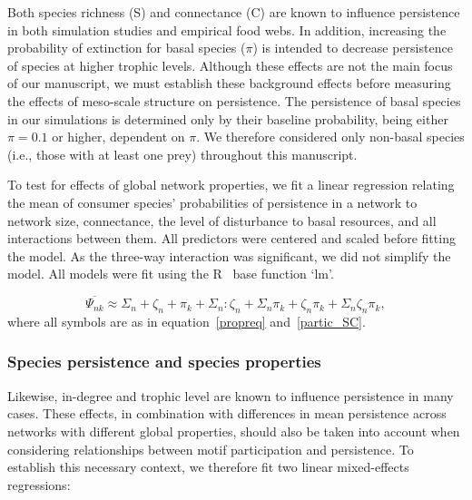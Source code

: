 \documentclass[12pt]{article}
\begin{document}
\begin{spacing}{2.0}
            Both species richness (S) and connectance (C) are known to influence persistence in both simulation studies and empirical food webs.
            In addition, increasing the probability of extinction for basal species ($\pi$) is intended to decrease persistence of species at higher trophic levels.
            Although these effects are not the main focus of our manuscript, we must establish these background effects before measuring the effects of meso-scale structure on persistence.
            The persistence of basal species in our simulations is determined only by their baseline probability, being either $\pi = 0.1$ or higher, dependent on $\pi$.
            We therefore considered only non-basal species (i.e., those with at least one prey) throughout this manuscript.

            To test for effects of global network properties, we fit a linear regression relating the mean of consumer species' probabilities of persistence in a network to network size, connectance, the level of disturbance to basal resources, and all interactions between them. 
            All predictors were centered and scaled before fitting the model. 
            As the three-way interaction was significant, we did not simplify the model.
            All models were fit using the R~\citep{R} base function `lm'.


            \begin{equation}
                \overline{\Psi_{nk}} \approx \Sigma_{n} + \zeta_{n} + \pi_k + \Sigma_{n}:\zeta_{n} + \Sigma_{n}\pi_k + \zeta_{n}\pi_k + \Sigma_{n}\zeta_{n}\pi_k,
                \label{SCeq}
            \end{equation}
            where all symbols are as in equation~\ref{propreq} and~\ref{partic_SC}.
                  

        \subsubsection{Species persistence and species properties}
    
            Likewise, in-degree and trophic level are known to influence persistence in many cases.
            These effects, in combination with differences in mean persistence across networks with different global properties, should also be taken into account when considering relationships between motif participation and persistence.
            To establish this necessary context, we therefore fit two linear mixed-effects regressions:


\end{spacing}
\end{document}
